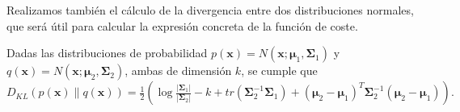 Realizamos también el cálculo de la divergencia entre dos distribuciones normales, que será útil para calcular la expresión concreta de la función de coste.

\begin{proposicion} Dadas las distribuciones de probabilidad  $p(\textbf{x}) = N(\textbf{x};\boldsymbol{\mu}_1, \boldsymbol{\Sigma}_1) $ y $q(\textbf{x}) = N(\textbf{x};\boldsymbol{\mu}_2, \boldsymbol{\Sigma}_2)$, ambas de dimensión $k$,
se cumple que $D_{KL}(p(\textbf{x}) \parallel q(\textbf{x})) = \frac{1}{2} \left( \log \frac{|\boldsymbol{\Sigma}_1|}{|\boldsymbol{\Sigma}_2|} - k + tr(\boldsymbol{\Sigma}_2^{-1}\boldsymbol{\Sigma}_1) + (\boldsymbol{\mu}_2 - \boldsymbol{\mu}_1)^T \boldsymbol{\Sigma}_2^{-1} (\boldsymbol{\mu}_2 - \boldsymbol{\mu}_1) \right).$\end{proposicion}

